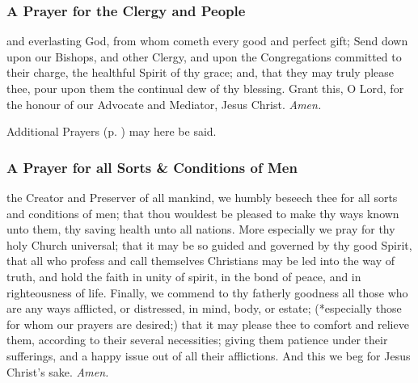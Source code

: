 \subsubsection{A Prayer for the Clergy and People}
 and everlasting God, from whom cometh every good and perfect gift; Send down upon our Bishops, and other Clergy, and upon the Congregations committed to their charge, the healthful Spirit of thy grace; and, that they may truly please thee, pour upon them the continual dew of thy blessing. Grant this, O Lord, for the honour of our Advocate and Mediator, Jesus Christ. \textit{Amen.}

\begin{rubric}
    Additional Prayers (p. \pageref{prayers}) may here be said.
\end{rubric}

\subsubsection{A Prayer for all Sorts \& Conditions of Men}
 the Creator and Preserver of all mankind, we humbly beseech thee for all sorts and conditions of men; that thou wouldest be pleased to make thy ways known unto them, thy saving health unto all nations. More especially we pray for thy holy Church universal; that it may be so guided and governed by thy good Spirit, that all who profess and call themselves Christians may be led into the way of truth, and hold the faith in unity of spirit, in the bond of peace, and in righteousness of life. Finally, we commend to thy fatherly goodness all those who are any ways afflicted, or distressed, in mind, body, or estate; (*especially those for whom our prayers are desired;) that it may please thee to comfort and relieve them, according to their several necessities; giving them patience under their sufferings, and a happy issue out of all their afflictions. And this we beg for Jesus Christ's sake. \textit{Amen.}

\clearpage
